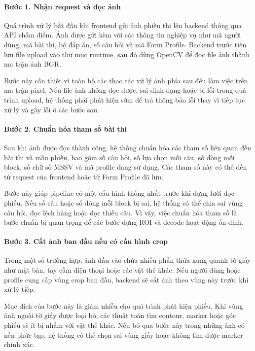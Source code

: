 \paragraph{Bước 1. Nhận request và đọc ảnh}

Quá trình xử lý bắt đầu khi frontend gửi ảnh phiếu thi lên backend thông qua API chấm điểm. Ảnh được gửi kèm với các thông tin nghiệp vụ như mã người dùng, mã bài thi, bộ đáp án, số câu hỏi và mã Form Profile. Backend trước tiên lưu file upload vào thư mục runtime, sau đó dùng OpenCV để đọc file ảnh thành ma trận ảnh BGR.

Bước này cần thiết vì toàn bộ các thao tác xử lý ảnh phía sau đều làm việc trên ma trận pixel. Nếu file ảnh không đọc được, sai định dạng hoặc bị lỗi trong quá trình upload, hệ thống phải phát hiện sớm để trả thông báo lỗi thay vì tiếp tục xử lý và gây lỗi ở các bước sau.

\paragraph{Bước 2. Chuẩn hóa tham số bài thi}

Sau khi ảnh được đọc thành công, hệ thống chuẩn hóa các tham số liên quan đến bài thi và mẫu phiếu, bao gồm số câu hỏi, số lựa chọn mỗi câu, số dòng mỗi block, số chữ số MSSV và mã profile đang sử dụng. Các tham số này có thể đến từ request của frontend hoặc từ Form Profile đã lưu.

Bước này giúp pipeline có một cấu hình thống nhất trước khi dựng lưới đọc phiếu. Nếu số câu hoặc số dòng mỗi block bị sai, hệ thống có thể chia sai vùng câu hỏi, đọc lệch hàng hoặc đọc thiếu câu. Vì vậy, việc chuẩn hóa tham số là bước chuẩn bị quan trọng để các bước dựng ROI và decode hoạt động ổn định.

\paragraph{Bước 3. Cắt ảnh ban đầu nếu có cấu hình crop}

Trong một số trường hợp, ảnh đầu vào chứa nhiều phần thừa xung quanh tờ giấy như mặt bàn, tay cầm điện thoại hoặc các vật thể khác. Nếu người dùng hoặc profile cung cấp vùng crop ban đầu, backend sẽ cắt ảnh theo vùng này trước khi xử lý tiếp.

Mục đích của bước này là giảm nhiễu cho quá trình phát hiện phiếu. Khi vùng ảnh ngoài tờ giấy được loại bỏ, các thuật toán tìm contour, marker hoặc góc phiếu sẽ ít bị nhầm với vật thể khác. Nếu bỏ qua bước này trong những ảnh có nền phức tạp, hệ thống có thể chọn sai vùng giấy hoặc không tìm được marker chính xác.

